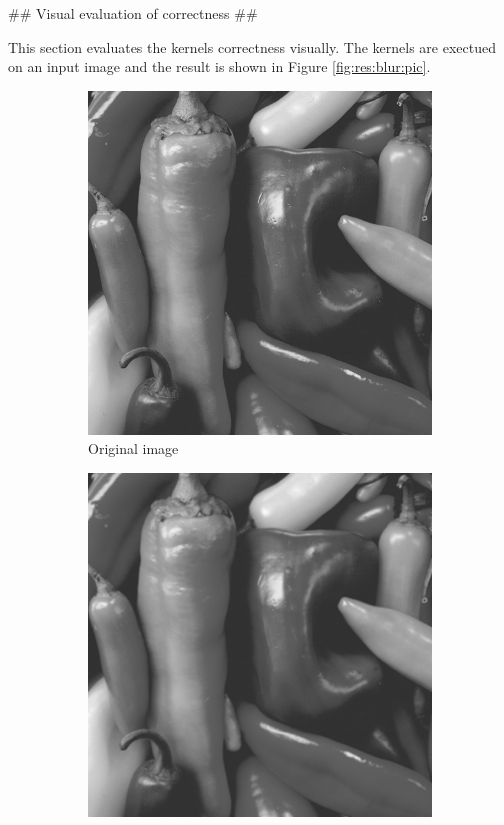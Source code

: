 \begin{markdown}
## Visual evaluation of correctness ##

This section evaluates the kernels correctness visually. The kernels
are exectued on an input image and the result is shown in Figure
\ref{fig:res:blur:pic}.

\begin{figure}[H]
  \centering
  \begin{subfigure}{.49\textwidth}
    \centering
    \includegraphics[width=1\textwidth]{body/figures/results/blur/input.png}
    \caption{Original image}
    \label{fig:res:blur:pic:input}
  \end{subfigure}%
  \hspace{.01\textwidth}
  \begin{subfigure}{.49\textwidth}
    \centering
    \includegraphics[width=1\textwidth]{body/figures/results/blur/cuda.png}

\end{subfigure}
\end{figure}
\end{markdown}

